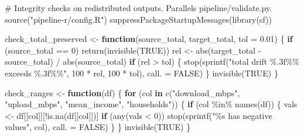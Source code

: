 \documentclass[
  letterpaper,
  DIV=11,
  numbers=noendperiod]{scrreprt}
\newenvironment{Shaded}{\begin{snugshade}}{\end{snugshade}}
\newcommand{\AttributeTok}[1]{\textcolor[rgb]{0.40,0.45,0.13}{#1}}
\newcommand{\CommentTok}[1]{\textcolor[rgb]{0.37,0.37,0.37}{#1}}
\newcommand{\ConstantTok}[1]{\textcolor[rgb]{0.56,0.35,0.01}{#1}}
\newcommand{\ControlFlowTok}[1]{\textcolor[rgb]{0.00,0.23,0.31}{\textbf{#1}}}
\newcommand{\DecValTok}[1]{\textcolor[rgb]{0.68,0.00,0.00}{#1}}
\newcommand{\FloatTok}[1]{\textcolor[rgb]{0.68,0.00,0.00}{#1}}
\newcommand{\FunctionTok}[1]{\textcolor[rgb]{0.28,0.35,0.67}{#1}}
\newcommand{\NormalTok}[1]{\textcolor[rgb]{0.00,0.23,0.31}{#1}}
\newcommand{\OtherTok}[1]{\textcolor[rgb]{0.00,0.23,0.31}{#1}}
\newcommand{\SpecialCharTok}[1]{\textcolor[rgb]{0.37,0.37,0.37}{#1}}
\newcommand{\StringTok}[1]{\textcolor[rgb]{0.13,0.47,0.30}{#1}}
\begin{document}
\begin{Shaded}
\begin{Highlighting}[]
\CommentTok{\# Integrity checks on redistributed outputs. Parallels pipeline/validate.py.}
\FunctionTok{source}\NormalTok{(}\StringTok{"pipeline{-}r/config.R"}\NormalTok{)}
\FunctionTok{suppressPackageStartupMessages}\NormalTok{(}\FunctionTok{library}\NormalTok{(sf))}

\NormalTok{check\_total\_preserved }\OtherTok{\textless{}{-}} \ControlFlowTok{function}\NormalTok{(source\_total, target\_total, }\AttributeTok{tol =} \FloatTok{0.01}\NormalTok{) \{}
  \ControlFlowTok{if}\NormalTok{ (source\_total }\SpecialCharTok{==} \DecValTok{0}\NormalTok{) }\FunctionTok{return}\NormalTok{(}\FunctionTok{invisible}\NormalTok{(}\ConstantTok{TRUE}\NormalTok{))}
\NormalTok{  rel }\OtherTok{\textless{}{-}} \FunctionTok{abs}\NormalTok{(target\_total }\SpecialCharTok{{-}}\NormalTok{ source\_total) }\SpecialCharTok{/} \FunctionTok{abs}\NormalTok{(source\_total)}
  \ControlFlowTok{if}\NormalTok{ (rel }\SpecialCharTok{\textgreater{}}\NormalTok{ tol) \{}
    \FunctionTok{stop}\NormalTok{(}\FunctionTok{sprintf}\NormalTok{(}\StringTok{"total drift \%.3f\%\% exceeds \%.3f\%\%"}\NormalTok{, }\DecValTok{100} \SpecialCharTok{*}\NormalTok{ rel, }\DecValTok{100} \SpecialCharTok{*}\NormalTok{ tol), }\AttributeTok{call. =} \ConstantTok{FALSE}\NormalTok{)}
\NormalTok{  \}}
  \FunctionTok{invisible}\NormalTok{(}\ConstantTok{TRUE}\NormalTok{)}
\NormalTok{\}}

\NormalTok{check\_ranges }\OtherTok{\textless{}{-}} \ControlFlowTok{function}\NormalTok{(df) \{}
  \ControlFlowTok{for}\NormalTok{ (col }\ControlFlowTok{in} \FunctionTok{c}\NormalTok{(}\StringTok{"download\_mbps"}\NormalTok{, }\StringTok{"upload\_mbps"}\NormalTok{, }\StringTok{"mean\_income"}\NormalTok{, }\StringTok{"households"}\NormalTok{)) \{}
    \ControlFlowTok{if}\NormalTok{ (col }\SpecialCharTok{\%in\%} \FunctionTok{names}\NormalTok{(df)) \{}
\NormalTok{      vals }\OtherTok{\textless{}{-}}\NormalTok{ df[[col]][}\SpecialCharTok{!}\FunctionTok{is.na}\NormalTok{(df[[col]])]}
      \ControlFlowTok{if}\NormalTok{ (}\FunctionTok{any}\NormalTok{(vals }\SpecialCharTok{\textless{}} \DecValTok{0}\NormalTok{)) }\FunctionTok{stop}\NormalTok{(}\FunctionTok{sprintf}\NormalTok{(}\StringTok{"\%s has negative values"}\NormalTok{, col), }\AttributeTok{call. =} \ConstantTok{FALSE}\NormalTok{)}
\NormalTok{    \}}
\NormalTok{  \}}
  \FunctionTok{invisible}\NormalTok{(}\ConstantTok{TRUE}\NormalTok{)}
\NormalTok{\}}


\end{Highlighting}
\end{Shaded}
\end{document}
